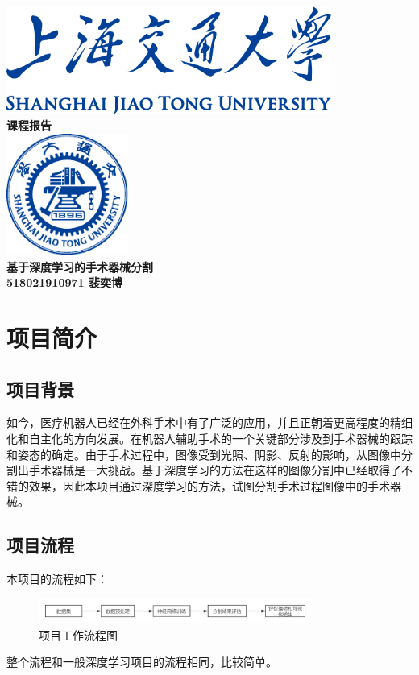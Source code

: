 \documentclass[UTF8]{ctexart}
\begin{document}
\begin{titlepage}
    \begin{center}
        \includegraphics[width=0.8\textwidth]{sjtu-name-blue.pdf}\\[1cm]
        \textsc{\Huge \bfseries 课程报告}\\[1.5cm]
        \includegraphics[width=0.3\textwidth]{sjtu-badge-blue.pdf}\\[0.5cm]    

        \Huge \bfseries{基于深度学习的手术器械分割}\\[1cm]
        \Large \bfseries{518021910971 裴奕博}
    \end{center}
\end{titlepage}
\tableofcontents
\newpage

\section{项目简介}

\subsection{项目背景}
如今，医疗机器人已经在外科手术中有了广泛的应用，并且正朝着更高程度的精细化和自主化的方向发展。在机器人辅助手术的一个关键部分涉及到手术器械的跟踪和姿态的确定。由于手术过程中，图像受到光照、阴影、反射的影响，从图像中分割出手术器械是一大挑战。基于深度学习的方法在这样的图像分割中已经取得了不错的效果，因此本项目通过深度学习的方法，试图分割手术过程图像中的手术器械。

\subsection{项目流程}
本项目的流程如下：
\begin{figure}[H]
    \centering  %
    \includegraphics[width=0.8\textwidth]{figure/workflow.png}
    \caption{项目工作流程图}
\end{figure}
整个流程和一般深度学习项目的流程相同，比较简单。
\end{document}
